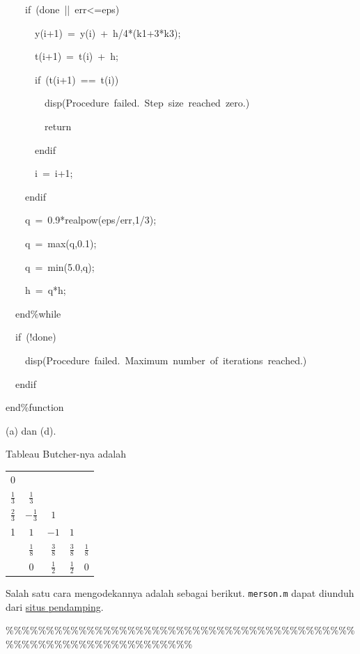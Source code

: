 \begin{description}
\begin{lyxcode}
~~~~if~(done~||~err<=eps)

~~~~~~y(i+1)~=~y(i)~+~h/4{*}(k1+3{*}k3);

~~~~~~t(i+1)~=~t(i)~+~h;

~~~~~~if~(t(i+1)~==~t(i))

~~~~~~~~disp(\textquotedbl Procedure~failed.~Step~size~reached~zero.\textquotedbl )

~~~~~~~~return

~~~~~~endif

~~~~~~i~=~i+1;

~~~~endif

~~~~q~=~0.9{*}realpow(eps/err,1/3);

~~~~q~=~max(q,0.1);

~~~~q~=~min(5.0,q);

~~~~h~=~q{*}h;

~~end\%while

~~if~(!done)

~~~~disp(\textquotedbl Procedure~failed.~Maximum~number~of~iterations~reached.\textquotedbl )

~~endif

end\%function
\end{lyxcode}
\item [{\ref{exc:ode-adaptive-6}:}] (a) dan (d).
\item [{\ref{exc:ode-adaptive-17}:}] Tableau Butcher-nya adalah

\begin{center}
\begin{tabular}{c|cccc}
0 &  &  &  & \tabularnewline
$\frac{1}{3}$ & $\frac{1}{3}$ &  &  & \tabularnewline
$\frac{2}{3}$ & $-\frac{1}{3}$ & $1$ &  & \tabularnewline
1 & $1$ & $-1$ & $1$ & \tabularnewline
\hline 
 & $\frac{1}{8}$ & $\frac{3}{8}$ & $\frac{3}{8}$ & $\frac{1}{8}$\tabularnewline
\hline 
 & $0$ & $\frac{1}{2}$ & $\frac{1}{2}$ & $0$\tabularnewline
\end{tabular}
\par\end{center}
\item [{\ref{exc:ode-adaptive-15}:}] Salah satu cara mengodekannya adalah
sebagai berikut. \texttt{merson.m} dapat
diunduh dari \href{http://lqbrin.github.io/tea-time-numerical/ancillaries.html}{situs pendamping}.

\begin{lyxcode}
\%\%\%\%\%\%\%\%\%\%\%\%\%\%\%\%\%\%\%\%\%\%\%\%\%\%\%\%\%\%\%\%\%\%\%\%\%\%\%\%\%\%\%\%\%\%\%\%\%\%\%\%\%\%\%\%\%\%\%\%\%\%\%\%\%\%


\end{lyxcode}
\end{description}
